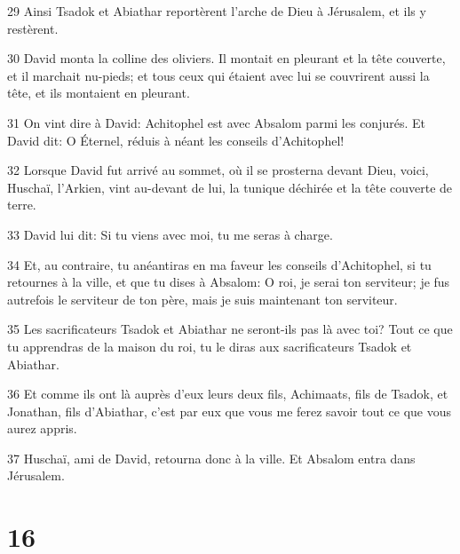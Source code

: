 \par 29 Ainsi Tsadok et Abiathar reportèrent l'arche de Dieu à Jérusalem, et ils y restèrent.
\par 30 David monta la colline des oliviers. Il montait en pleurant et la tête couverte, et il marchait nu-pieds; et tous ceux qui étaient avec lui se couvrirent aussi la tête, et ils montaient en pleurant.
\par 31 On vint dire à David: Achitophel est avec Absalom parmi les conjurés. Et David dit: O Éternel, réduis à néant les conseils d'Achitophel!
\par 32 Lorsque David fut arrivé au sommet, où il se prosterna devant Dieu, voici, Huschaï, l'Arkien, vint au-devant de lui, la tunique déchirée et la tête couverte de terre.
\par 33 David lui dit: Si tu viens avec moi, tu me seras à charge.
\par 34 Et, au contraire, tu anéantiras en ma faveur les conseils d'Achitophel, si tu retournes à la ville, et que tu dises à Absalom: O roi, je serai ton serviteur; je fus autrefois le serviteur de ton père, mais je suis maintenant ton serviteur.
\par 35 Les sacrificateurs Tsadok et Abiathar ne seront-ils pas là avec toi? Tout ce que tu apprendras de la maison du roi, tu le diras aux sacrificateurs Tsadok et Abiathar.
\par 36 Et comme ils ont là auprès d'eux leurs deux fils, Achimaats, fils de Tsadok, et Jonathan, fils d'Abiathar, c'est par eux que vous me ferez savoir tout ce que vous aurez appris.
\par 37 Huschaï, ami de David, retourna donc à la ville. Et Absalom entra dans Jérusalem.

\chapter{16}

